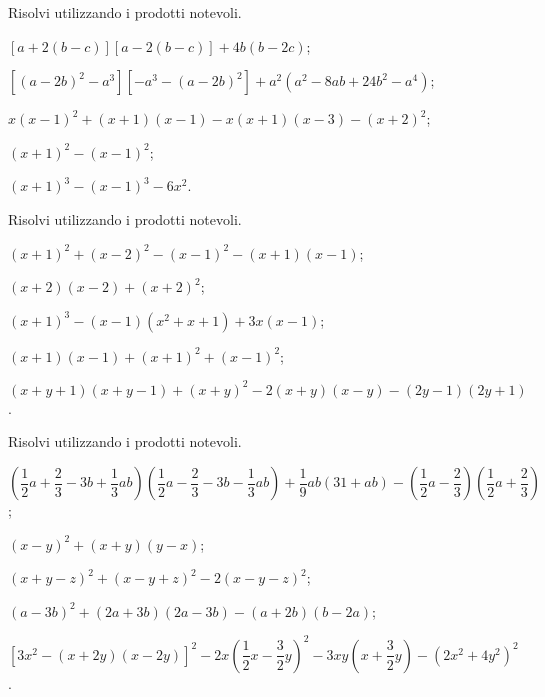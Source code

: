 \begin{esercizio}[\Ast]
 \label{ese:12.31}
Risolvi utilizzando i prodotti notevoli.
 \begin{enumeratea}
 \item $\left[a+2\left(b-c\right)\right]\left[a-2\left(b-c\right)\right]+4b(b-2c)$;
 \item $\left[\left(a-2b\right)^{2}-a^{3}\right]\left[-a^{3}-\left(a-2b\right)^2\right]+a^{2}(a^{2}-8{ab}+24b^{2}-a^{4})$;
 \item $x(x-1)^{2}+(x+1)(x-1)-x(x+1)(x-3)-(x+2)^{2}$;
 \item $(x+1)^{2}-(x-1)^{2}$;
 \item $(x+1)^{3}-(x-1)^{3}-6x^2$.
 \end{enumeratea}
\end{esercizio}

\begin{esercizio}[\Ast]
 \label{ese:12.32}
Risolvi utilizzando i prodotti notevoli.
 \begin{enumeratea}
 \item $(x+1)^{2}+(x-2)^{2}-(x-1)^{2}-(x+1)(x-1)$;
 \item $(x+2)(x-2)+(x+2)^{2}$;
 \item $(x+1)^{3}-(x-1)\left(x^{2}+x+1\right)+3x(x-1)$;
 \item $(x+1)(x-1)+(x+1)^{2}+(x-1)^{2}$;
 \item $(x+y+1)(x+y-1)+(x+y)^{2}-2(x+y)(x-y)-(2y-1)(2y+1)$.
 \end{enumeratea}
\end{esercizio}

\begin{esercizio}[\Ast]
 \label{ese:12.33}
Risolvi utilizzando i prodotti notevoli.
 \begin{enumeratea}
 \item $\left(\dfrac{1}{2}a+\dfrac{2}{3}-3b+\dfrac{1}{3}{ab}\right)\left(\dfrac{1}{2}a-\dfrac{2}{3}-3b-\dfrac{1}{3}{ab}\right)+\dfrac{1}{9}{ab}(31+{ab})-\left(\dfrac{1}{2}a-\dfrac{2}{3}\right)\left(\dfrac{1}{2}a+\dfrac{2}{3}\right)$;
 \item $(x-y)^{2}+(x+y)(y-x)$;
 \item $(x+y-z)^2+(x-y+z)^2-2(x-y-z)^2$;
 \item $(a-3b)^{2}+(2a+3b)(2a-3b)-(a+2b)(b-2a)$;
 \item $\left[3x^{2}-(x+2y)(x-2y)\right]^{2}-2x\left(\dfrac{1}{2}x-\dfrac{3}{2}y\right)^{2}-3{xy}\left(x+\dfrac{3}{2}y\right)-\left(2x^{2}+4y^{2}\right)^{2}$.
 \end{enumeratea}
\end{esercizio}

